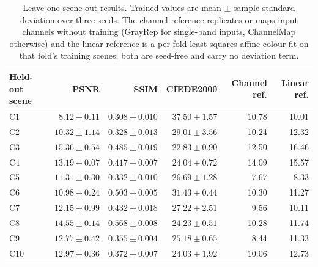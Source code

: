 \begin{table}[H]
\centering
\caption{Leave-one-scene-out results. Trained values are mean $\pm$ sample standard deviation over three seeds. The channel reference replicates or maps input channels without training (GrayRep for single-band inputs, ChannelMap otherwise) and the linear reference is a per-fold least-squares affine colour fit on that fold's training scenes; both are seed-free and carry no deviation term.}
\label{tab:scene-results}
\small
\begin{tabular}{lrrrrr}
\toprule
Held-out scene & PSNR & SSIM & CIEDE2000 & Channel ref. & Linear ref. \\
\midrule
C1 & $8.12\pm0.11$ & $0.308\pm0.010$ & $37.50\pm1.57$ & 10.78 & 10.01 \\
C2 & $10.32\pm1.14$ & $0.328\pm0.013$ & $29.01\pm3.56$ & 10.24 & 12.32 \\
C3 & $15.36\pm0.54$ & $0.485\pm0.019$ & $22.83\pm0.90$ & 12.50 & 16.46 \\
C4 & $13.19\pm0.07$ & $0.417\pm0.007$ & $24.04\pm0.72$ & 14.09 & 15.57 \\
C5 & $11.31\pm0.30$ & $0.332\pm0.010$ & $26.69\pm1.28$ & 7.67 & 8.33 \\
C6 & $10.98\pm0.24$ & $0.503\pm0.005$ & $31.43\pm0.44$ & 10.30 & 11.27 \\
C7 & $12.15\pm0.99$ & $0.432\pm0.018$ & $27.22\pm2.51$ & 9.56 & 10.11 \\
C8 & $14.55\pm0.14$ & $0.568\pm0.008$ & $24.23\pm0.51$ & 10.28 & 11.74 \\
C9 & $12.77\pm0.42$ & $0.355\pm0.004$ & $25.18\pm0.65$ & 8.44 & 11.33 \\
C10 & $12.97\pm0.36$ & $0.372\pm0.007$ & $24.03\pm1.92$ & 10.06 & 12.73 \\
\bottomrule
\end{tabular}
\end{table}
